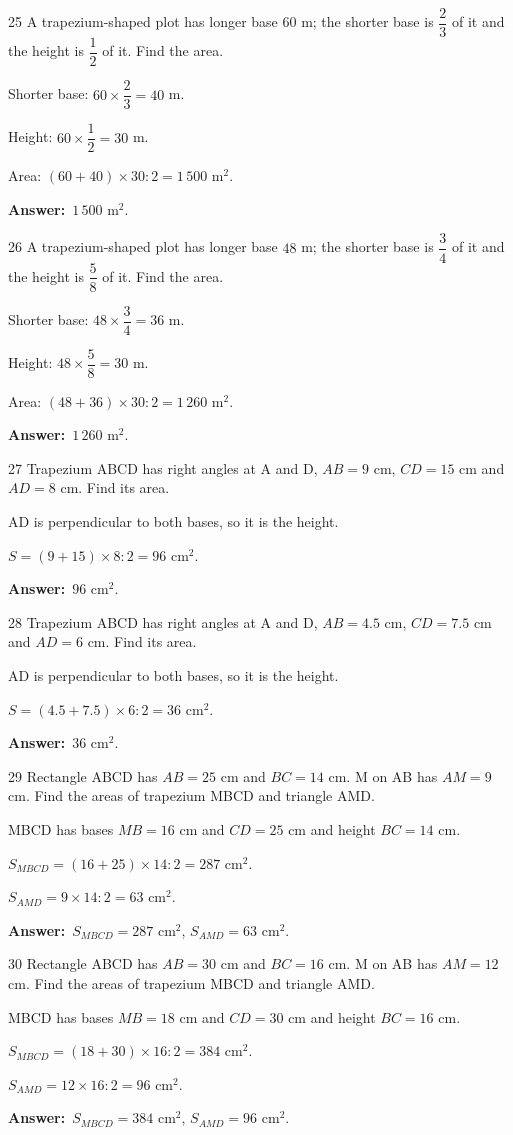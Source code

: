 \documentclass[11pt]{article}
\newif\ifsol \solfalse
\providecommand{\AnsWord}{Đáp số}
\newcommand{\dapso}[1]{\par\textbf{\AnsWord:}\ #1}
\newcommand{\probsol}[1]{%
  \begin{lrbox}{\solmeasure}\begin{minipage}{\dimexpr\linewidth-24pt\relax}#1\end{minipage}\end{lrbox}%
  \ifsol
    \begin{solbox}#1\end{solbox}%
  \else
    \setlength{\solht}{\dimexpr\ht\solmeasure+\dp\solmeasure+0.85cm\relax}%
    \ifdim\solht<1.35cm\setlength{\solht}{1.35cm}\fi
    \begin{tcolorbox}[colback=white,colframe=Line,boxrule=0.8pt,arc=5pt,
      left=8pt,right=8pt,top=4pt,bottom=4pt,height=\solht]{\footnotesize\color{Slate}\itshape\WorkWord}\end{tcolorbox}%
  \fi}
\newcommand{\gap}{\vspace{0.3cm}}
\def\WorkWord{Your work:}
\def\AnsWord{Answer}
\begin{document}
\gap
\begin{probbox}{25}{\relax}
A trapezium-shaped plot has longer base $60$ m; the shorter base is $\dfrac{2}{3}$ of it and the height is $\dfrac{1}{2}$ of it. Find the area.
\end{probbox}
\probsol{
Shorter base: $60\times\dfrac{2}{3}=40$ m.\par Height: $60\times\dfrac{1}{2}=30$ m.\par Area: $(60+40)\times30:2=1\,500$ m$^2$.
\dapso{$1\,500$ m$^2$.}}
\gap
\begin{probbox}{26}{\relax}
A trapezium-shaped plot has longer base $48$ m; the shorter base is $\dfrac{3}{4}$ of it and the height is $\dfrac{5}{8}$ of it. Find the area.
\end{probbox}
\probsol{
Shorter base: $48\times\dfrac{3}{4}=36$ m.\par Height: $48\times\dfrac{5}{8}=30$ m.\par Area: $(48+36)\times30:2=1\,260$ m$^2$.
\dapso{$1\,260$ m$^2$.}}
\gap
\begin{probbox}{27}{\relax}
Trapezium ABCD has right angles at A and D, $AB=9$ cm, $CD=15$ cm and $AD=8$ cm. Find its area.
\end{probbox}
\probsol{
AD is perpendicular to both bases, so it is the height.\par $S=(9+15)\times8:2=96$ cm$^2$.
\dapso{$96$ cm$^2$.}}
\gap
\begin{probbox}{28}{\relax}
Trapezium ABCD has right angles at A and D, $AB=4.5$ cm, $CD=7.5$ cm and $AD=6$ cm. Find its area.
\end{probbox}
\probsol{
AD is perpendicular to both bases, so it is the height.\par $S=(4.5+7.5)\times6:2=36$ cm$^2$.
\dapso{$36$ cm$^2$.}}
\gap
\begin{probbox}{29}{\relax}
Rectangle ABCD has $AB=25$ cm and $BC=14$ cm. M on AB has $AM=9$ cm. Find the areas of trapezium MBCD and triangle AMD.
\end{probbox}
\probsol{
MBCD has bases $MB=16$ cm and $CD=25$ cm and height $BC=14$ cm.\par $S_{MBCD}=(16+25)\times14:2=287$ cm$^2$.\par $S_{AMD}=9\times14:2=63$ cm$^2$.
\dapso{$S_{MBCD}=287$ cm$^2$, $S_{AMD}=63$ cm$^2$.}}
\gap
\begin{probbox}{30}{\relax}
Rectangle ABCD has $AB=30$ cm and $BC=16$ cm. M on AB has $AM=12$ cm. Find the areas of trapezium MBCD and triangle AMD.
\end{probbox}
\probsol{
MBCD has bases $MB=18$ cm and $CD=30$ cm and height $BC=16$ cm.\par $S_{MBCD}=(18+30)\times16:2=384$ cm$^2$.\par $S_{AMD}=12\times16:2=96$ cm$^2$.
\dapso{$S_{MBCD}=384$ cm$^2$, $S_{AMD}=96$ cm$^2$.}}
\end{document}
